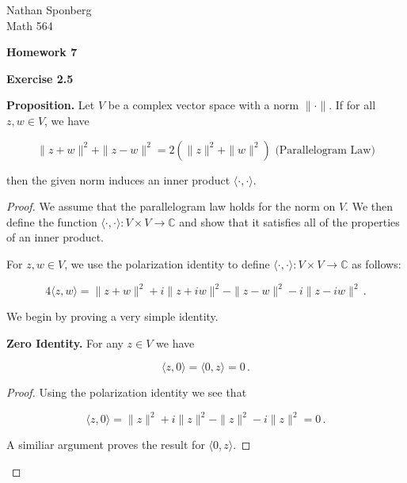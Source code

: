 \documentclass[a4paper]{article}
\numberwithin{equation}{section}
\begin{document}
\begin{flushright}
{\small{Nathan Sponberg\\}}
{\small{Math 564}}
\end{flushright}

\begin{center}
\bf{Homework 7}
\end{center}

\begin{description}

\item \textbf{Exercise 2.5}

\item \textbf{Proposition.} Let $V$ be a complex vector space with a norm $\|\cdot\|$. If for all $z,w \in V$, we have 

$$\|z+w\|^2 + \|z-w\|^2 = 2(\|z\|^2 + \|w\|^2) \text{ (Parallelogram Law)}$$

then the given norm induces an inner product $\langle \cdot, \cdot \rangle$.


\begin{proof} We assume that the parallelogram law holds for the norm on $V$. We then define the function $\langle \cdot, \cdot \rangle : V \times V \rightarrow \mathbb{C}$ and show that it satisfies all of the properties of an inner product. 

For $z,w \in V$, we use the polarization identity to define $\langle \cdot, \cdot \rangle : V \times V \rightarrow \mathbb{C}$ as follows:

$$4\langle z, w \rangle = \|z+w\|^2 + i\|z+iw\|^2 - \|z-w\|^2 - i\|z-iw\|^2\,.$$

We begin by proving a very simple identity.


\begin{description}

\item \textbf{Zero Identity.} For any $z \in V$ we have

$$\langle z,0 \rangle = \langle 0,z \rangle = 0\,.$$

\begin{proof} Using the polarization identity we see that

$$\langle z,0 \rangle = \|z\|^2 + i\|z\|^2 - \|z\|^2 - i\|z\|^2 = 0\,.$$

A similiar argument proves the result for $\langle 0,z \rangle$.


\end{proof}
\end{description}
\end{proof}
\end{description}
\end{document}
